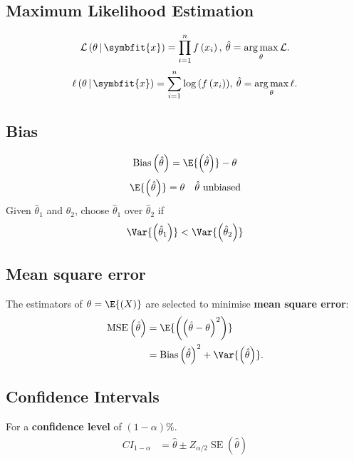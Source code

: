 \documentclass{article}
\DeclareMathOperator*{\argmax}{arg\,max}
\begin{document}
\begin{multicols}{3}
    \subsection{Maximum Likelihood Estimation}
    \begin{equation*}
        \mathcal{L}\left( \theta \,\vert\, \symbfit{x} \right) = \prod_{i = 1}^n f\left( x_i \right),\: \hat{\theta} = \argmax_\theta{\mathcal{L}}.
    \end{equation*}
    \begin{equation*}
        \ell\left( \theta \,\vert\, \symbfit{x} \right) = \sum_{i = 1}^n \log{\left( f\left( x_i \right) \right)},\: \hat{\theta} = \argmax_\theta{\ell}.
    \end{equation*}
    \subsection{Bias}
    \begin{equation*}
        \operatorname{Bias}\left( \hat{\theta} \right) = \E{\left( \hat{\theta} \right)} - \theta
    \end{equation*}
    \begin{equation*}
        \E{\left( \hat{\theta} \right)} = \theta \quad \text{\(\hat{\theta}\) unbiased}
    \end{equation*}
    Given \(\hat{\theta}_1\) and \(\hat{\theta}_2\), choose \(\hat{\theta}_1\) over \(\hat{\theta}_2\) if
    \begin{equation*}
        \Var{\left( \hat{\theta}_1 \right)} < \Var{\left( \hat{\theta}_2 \right)}
    \end{equation*}
    \subsection{Mean square error}
    The estimators of \(\theta = \E{\left( X \right)}\)
    are selected to minimise \textbf{mean square error}:
    \begin{align*}
        \operatorname{MSE}\left( \hat{\theta} \right) & = \E{\left( \left( \hat{\theta} - \theta \right)^2 \right)}                             \\
                                                      & = \operatorname{Bias}\left( \hat{\theta} \right)^2 + \Var{\left( \hat{\theta} \right)}.
    \end{align*}
    \subsection{Confidence Intervals}
    For a \textbf{confidence level} of \(\left( 1 - \alpha \right)\%\).
    \begin{align*}
        {CI}_{1 - \alpha} & = \hat{\theta} \pm Z_{\alpha / 2} \operatorname{SE}\left( \hat{\theta} \right)
    \end{align*}

\end{multicols}
\end{document}
